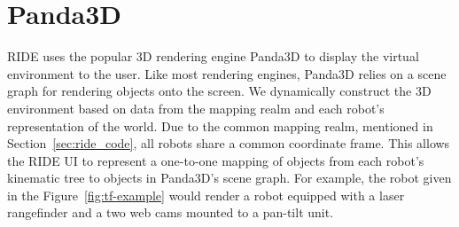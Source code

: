 % 
% 
% 
% 


\section{Panda3D}

RIDE uses the popular 3D rendering engine Panda3D to display the virtual environment to the user. Like most rendering engines, Panda3D relies on a scene graph for rendering objects onto the screen. We dynamically construct the 3D environment based on data from the mapping realm and each robot's representation of the world. Due to the common mapping realm, mentioned in Section~\ref{sec:ride_code}, all robots share a common coordinate frame. This allows the RIDE UI to represent a one-to-one mapping of objects from each robot's kinematic tree to objects in Panda3D's scene graph. For example, the robot given in the Figure~\ref{fig:tf-example} would render a robot equipped with a laser rangefinder and a two web cams mounted to a pan-tilt unit.

